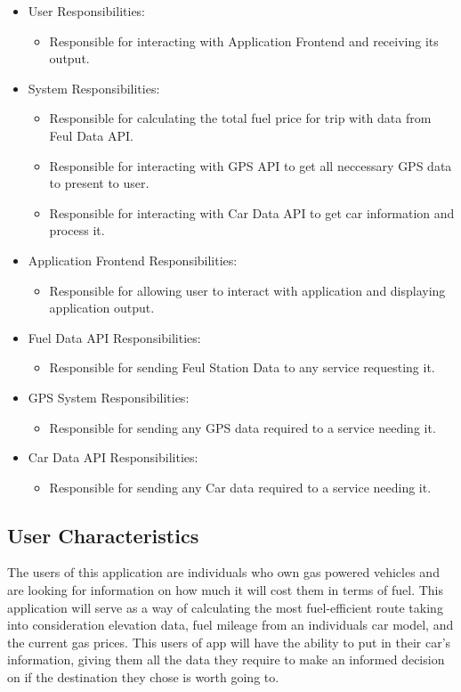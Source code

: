 \documentclass[12pt]{article}
\begin{document}
\begin{itemize}
\item User Responsibilities:
\begin{itemize}
\item Responsible for interacting with Application Frontend and receiving its output. 
\end{itemize}
\item \progname{} System Responsibilities:
\begin{itemize}
\item Responsible for calculating the total fuel price for trip with data from 
Feul Data API.
\item Responsible for interacting with GPS API to get all neccessary GPS data 
to present to user.
\item Responsible for interacting with Car Data API to get car information 
and process it.
\end{itemize}
\item Application Frontend Responsibilities:
\begin{itemize}
\item Responsible for allowing user to interact with application and displaying application output.
\end{itemize}
\item Fuel Data API Responsibilities:
\begin{itemize}
\item Responsible for sending Feul Station Data to any service requesting it.
\end{itemize}
\item GPS System Responsibilities:
\begin{itemize}
\item Responsible for sending any GPS data required to a service needing it.
\end{itemize}
\item Car Data API Responsibilities:
\begin{itemize}
\item Responsible for sending any Car data required to a service needing it.
\end{itemize}
\end{itemize}

\subsection{User Characteristics} \label{SecUserCharacteristics}

The users of this application are individuals who own gas powered vehicles and are looking for information on how much it will cost them in terms of fuel. This application will serve as a way of calculating the most fuel-efficient route taking into consideration elevation data, fuel mileage from an individuals car model, and the current gas prices. This users of app will have the ability to put in their car’s information, giving them all the data they require to make an informed decision on if the destination they chose is worth going to.
\end{document}
